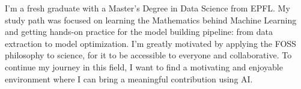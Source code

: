 

I'm a fresh graduate with a Master's Degree in Data Science from EPFL. My study path was focused on learning the Mathematics behind Machine Learning and getting hands-on practice for the model building pipeline: from data extraction to model optimization. I'm greatly motivated by applying the FOSS philosophy to science, for it to be accessible to everyone and collaborative. To continue my journey in this field, I want to find a motivating and enjoyable environment where I can bring a meaningful contribution using AI.
